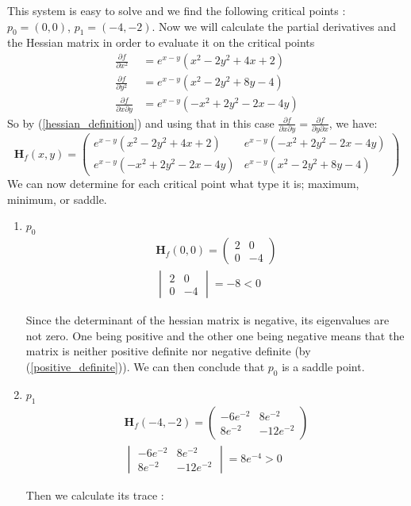 \documentclass[../convex_optimization.tex]{subfiles}
\begin{document}
This system is easy to solve and we find  the following critical points :
$p_0 = (0, 0)$, $p_1 = (-4, -2)$.
Now we will calculate the partial derivatives and the Hessian matrix
in order to evaluate it on the critical points
\begin{align}
\frac{\partial f}{\partial x^2} &= e^{x-y} (x^2- 2y^2 + 4x + 2)\nonumber\\
\frac{\partial f}{\partial y^2} &=  e^{x-y} (x^2- 2y^2 + 8y - 4)\nonumber\\
\frac{\partial f}{\partial x \partial y } &= e^{x-y} (-x^2 +2y^2 - 2x - 4y)\nonumber
\end{align}
So by (\ref{hessian_definition}) and using that in this case
$\frac{\partial f}{\partial x \partial y }=\frac{\partial f}{\partial y \partial x }$, 
we have:
\begin{equation}
    \mathbf H_f(x,y) =\begin{pmatrix}
        e^{x-y} (x^2- 2y^2 + 4x + 2) &   e^{x-y} (-x^2 +2y^2 - 2x - 4y) \\
        e^{x-y} (-x^2 +2y^2 - 2x - 4y) & e^{x-y} (x^2- 2y^2 + 8y - 4)
    \end{pmatrix}
    \label{firsthessian}
\end{equation}
We can now determine for each critical point what type it is; maximum, minimum, or saddle.
\begin{enumerate}
\item $p_0$
    \begin{gather}
        \mathbf H_f(0,0) =
        \begin{pmatrix}
            2  & 0\\
            0 & -4
        \end{pmatrix}\nonumber\\
        \begin{vmatrix}
            2  & 0\\
            0 & -4
        \end{vmatrix} = - 8 < 0
        \nonumber
    \end{gather}

Since the determinant of the hessian matrix is negative,
its eigenvalues are not zero.
One being positive and the other one being negative means that the matrix
is neither positive definite nor negative definite
(by (\ref{positive_definite})).
We can then conclude that $p_0$ is a saddle point.
\item $p_1$
    \begin{gather}
        \mathbf H_f(-4,-2) =
        \begin{pmatrix}
            -6e^{ -2}  & 8e^{ -2}\\
            8e^{ -2} & -12e^{ -2}
        \end{pmatrix}\nonumber\\
        \begin{vmatrix}
            -6e^{ -2}  & 8e^{ -2}\\
            8e^{ -2} & -12e^{ -2}
        \end{vmatrix} =  8e^{ -4} > 0
        \nonumber
    \end{gather}

Then we calculate its trace :
\end{enumerate}
\end{document}
